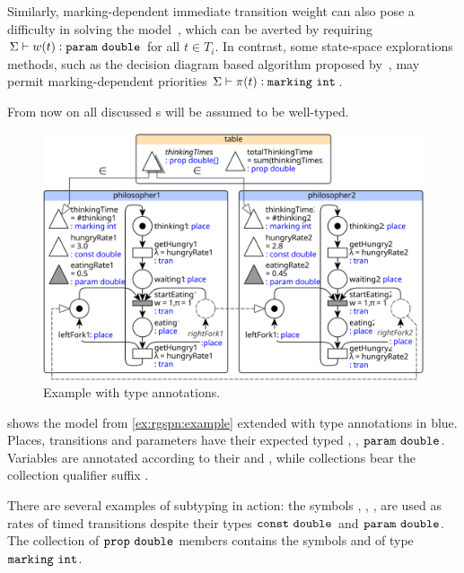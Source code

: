 Similarly, marking-dependent immediate transition weight can also pose a difficulty in solving the model~\citep{Teruel03netlevel}, which can be averted by requiring \(\Sigma \vdash w(t) \mathrel{\vcentcolon} \texttt{\upshape param}\ \texttt{\upshape double}\) for all \(t \in T_i\). In contrast, some state-space explorations methods, such as the decision diagram based algorithm proposed by~\citet{Marussy17priorities}, may permit marking-dependent priorities \(\Sigma \vdash \pi(t) \mathrel{\vcentcolon} \texttt{\upshape marking}\ \texttt{\upshape int}\).

From now on all discussed s will be assumed to be well-typed.

\begin{figure}
  \centering
  \includegraphics[scale=0.9]{figures/rgspn_example_typed}
  \caption{Example  with type annotations.}
  \label{fig:rgspn:example-typed}
\end{figure}

\begin{runningExample}
   shows the model from \vref{ex:rgspn:example} extended with type annotations in blue. Places, transitions and parameters have their expected typed , , \(\texttt{\upshape param}\ \texttt{\upshape double}\). Variables are annotated according to their  and , while collections bear the collection qualifier suffix \lit{[]}.

  There are several examples of subtyping in action: the symbols , , ,  are used as rates of timed transitions despite their types \(\texttt{\upshape const}\ \texttt{\upshape double}\) and \(\texttt{\upshape param}\ \texttt{\upshape double}\). The collection  of \(\texttt{\upshape prop}\ \texttt{\upshape double}\) members contains the symbols  and  of type \(\texttt{\upshape marking}\ \texttt{\upshape int}\).
\end{runningExample}

